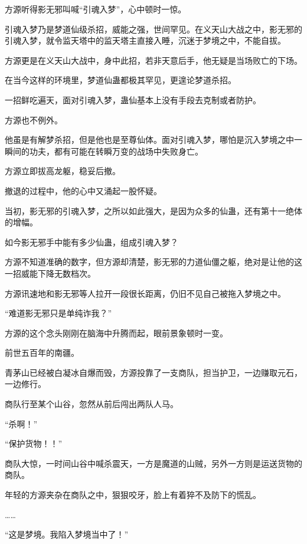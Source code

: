 
\begin{this_body}



方源听得影无邪叫喊“引魂入梦”，心中顿时一惊。

引魂入梦乃是梦道仙级杀招，威能之强，世间罕见。在义天山大战之中，影无邪的引魂入梦，就令监天塔中的监天塔主直接入睡，沉迷于梦境之中，不能自拔。

方源更是在义天山大战中，身中此招，若非天意后手，他无疑是当场败亡的下场。

在当今这样的环境里，梦道仙蛊都极其罕见，更遑论梦道杀招。

一招鲜吃遍天，面对引魂入梦，蛊仙基本上没有手段去克制或者防护。

方源也不例外。

他虽是有解梦杀招，但是他也是至尊仙体。面对引魂入梦，哪怕是沉入梦境之中一瞬间的功夫，都有可能在转瞬万变的战场中失败身亡。

方源立即拔高龙躯，稳妥后撤。

撤退的过程中，他的心中又涌起一股怀疑。

当初，影无邪的引魂入梦，之所以如此强大，是因为众多的仙蛊，还有第十一绝体的增幅。

如今影无邪手中能有多少仙蛊，组成引魂入梦？

方源不知道准确的数字，但方源却清楚，影无邪的力道仙僵之躯，绝对是让他的这一招威能下降无数档次。

方源讯速地和影无邪等人拉开一段很长距离，仍旧不见自己被拖入梦境之中。

“难道影无邪只是单纯诈我？”

方源的这个念头刚刚在脑海中升腾而起，眼前景象顿时一变。

前世五百年的南疆。

青茅山已经被白凝冰自爆而毁，方源投靠了一支商队，担当护卫，一边赚取元石，一边修行。

商队行至某个山谷，忽然从前后闯出两队人马。

“杀啊！”

“保护货物！！”

商队大惊，一时间山谷中喊杀震天，一方是魔道的山贼，另外一方则是运送货物的商队。

年轻的方源夹杂在商队之中，狠狠咬牙，脸上有着猝不及防下的慌乱。

……

“这是梦境。我陷入梦境当中了！”


\end{this_body}
